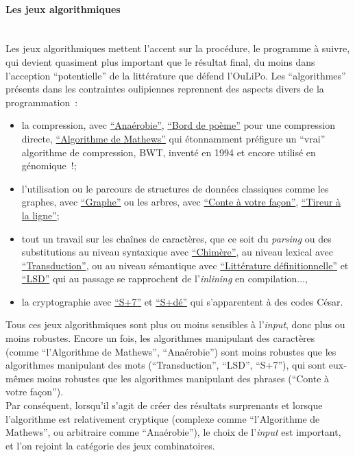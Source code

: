 \documentclass{article}
\newcommand{\subsubsubsection}[1]{\paragraph{#1}\mbox{}\\}
\begin{document}
				\subsubsubsection{Les jeux algorithmiques}
					Les jeux algorithmiques mettent l'accent sur la procédure, le programme à suivre, qui devient quasiment plus important que le résultat final, du moins dans l'acception ``potentielle'' de la littérature que défend l'OuLiPo. Les ``algorithmes'' présents dans les contraintes oulipiennes reprennent des aspects divers de la programmation~:
					\vspace{2mm}
					\begin{itemize}
						\item la compression, avec \href{http://oulipo.net/fr/contraintes/anaerobie}{``Anaérobie''}, \href{http://oulipo.net/fr/contraintes/bord-de-poeme}{``Bord de poème''} pour une compression directe, \href{http://oulipo.net/fr/contraintes/algorithme-de-mathews}{``Algorithme de Mathews''} qui étonnamment préfigure un ``vrai'' algorithme de compression, BWT, inventé en 1994 et encore utilisé en génomique~!;
						\item l'utilisation ou le parcours de structures de données classiques comme les graphes, avec \href{http://oulipo.net/fr/contraintes/graphe}{``Graphe''} ou les arbres, avec \href{http://oulipo.net/fr/contraintes/conte-a-votre-facon}{``Conte à votre façon''}, \href{http://oulipo.net/fr/contraintes/tireur-a-la-ligne}{``Tireur à la ligne''};
						\item tout un travail sur les chaînes de caractères, que ce soit du \textit{parsing} ou des substitutions au niveau syntaxique avec \href{http://oulipo.net/fr/contraintes/chimere}{``Chimère''}, au niveau lexical avec \href{http://oulipo.net/fr/contraintes/transduction}{``Transduction''}, ou au niveau sémantique avec \href{http://oulipo.net/fr/contraintes/litterature-definitionnelle}{``Littérature définitionnelle''} et \href{http://oulipo.net/fr/contraintes/lsd}{``LSD''} qui au passage se rapprochent de l'\textit{inlining} en compilation...,
						\item la cryptographie avec \href{http://oulipo.net/fr/contraintes/s7}{``S+7''} et \href{http://oulipo.net/fr/contraintes/sde}{``S+dé''} qui s'apparentent à des codes César.
					\end{itemize}
					\vspace{2mm}
					Tous ces jeux algorithmiques sont plus ou moins sensibles à l'\textit{input}, donc plus ou moins robustes. Encore un fois, les algorithmes manipulant des caractères (comme ``l'Algorithme de Mathews'', ``Anaérobie'') sont moins robustes que les algorithmes manipulant des mots (``Transduction'', ``LSD'', ``S+7''), qui sont eux-mêmes moins robustes que les algorithmes manipulant des phrases (``Conte à votre façon'').\\
					Par conséquent, lorsqu'il s'agit de créer des résultats surprenants et lorsque l'algorithme est relativement cryptique (complexe comme ``l'Algorithme de Mathews'', ou arbitraire comme ``Anaérobie''), le choix de l'\textit{input} est important, et l'on rejoint la catégorie des jeux combinatoires.
				
\end{document}
